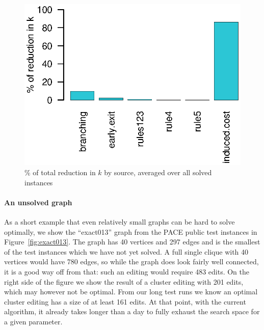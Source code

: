 \documentclass[12pt,oneside,english,parskip=full,headings=small]{scrbook}
\newcommand{\todo}[1]{\paragraph{TODO} #1}
\theoremstyle{definition}
\begin{document}
\begin{figure}[h]
	\centering
	\includegraphics[scale=0.8]{interleaved_effectiveness}
	\caption{\% of total reduction in $k$ by source, averaged over all solved instances}
	\label{fig:interleaved_effectiveness}
\end{figure}



\paragraph{An unsolved graph} As a short example that even relatively small graphs can be hard to
solve optimally, we show the ``exact013'' graph from the PACE public test instances in
Figure~\ref{fig:exact013}. The graph has 40 vertices and 297 edges and is the smallest of the test
instances which we have not yet solved. A full single clique with 40 vertices would have 780 edges,
so while the graph does look fairly well connected, it is a good way off from that: such an editing
would require 483 edits. On the right side of the figure we show the result of a cluster editing
with 201 edits, which may however not be optimal. From our long test runs we know an optimal cluster
editing has a size of at least 161 edits. At that point, with the current algorithm, it already
takes longer than a day to fully exhaust the search space for a given parameter.
\end{document}
